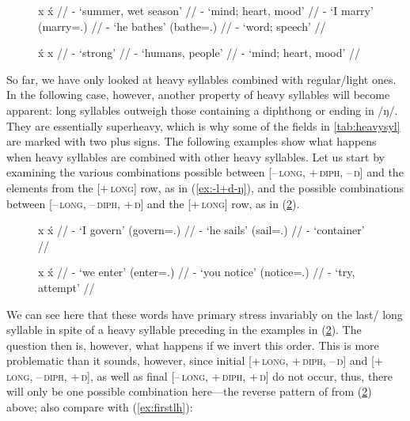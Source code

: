 \begin{figure}[h]
\pex[everygla=\upshape]\label{ex:firstlh}
\a\label{ex:firstlight}\begingl
	\gla x		{}	x́	{} //
	\glb {}	-	
		{`summer, wet season'} //
	\glb {}	-		{`mind; heart, mood'} //
	\glb {}	-	
		{`I marry' (marry=\Fsg{}.\Top{})} //
	\glb {}	-	
		{`he bathes' (bathe=\TsgM{}.\Aarg{})} //
	\glb {}	-		{`word; speech'} //
\endgl

\a\label{ex:firstheavy}\begingl
	\gla x́		{}	x		{} //
	\glb {}	-			{`strong'} //
	\glb {}	-		{`humans, people'} //
	\glb {}	-			{`mind; heart, mood'} //
\endgl
\xe
\end{figure}

So far, we have only looked at heavy syllables combined with regular/light
ones. In the following case, however, another property of heavy syllables will
become apparent: long syllables outweigh those containing a diphthong or ending
in /ŋ/. They are essentially superheavy, which is
why some of the fields in \autoref{tab:heavysyl} are marked with two plus
signs. The following examples show what happens when heavy syllables are
combined with other heavy syllables. Let us start by examining the various
combinations possible between \textsc{[–\,long, +\,diph, –\,ŋ]} and the
elements from the \textsc{[+\,long]} row, as in (\ref{ex:-l+d-ŋ}), and the
possible combinations between \textsc{[\mbox{–\,long,} \mbox{–\,diph,} +\,ŋ]}
and the \textsc{[+\,long]} row, as in (\ref{ex:-l-d+ŋ}).

\begin{figure}[h]
\pex[everygla=\upshape]\label{ex:lastheavy}
\a\label{ex:-l+d-ŋ}\begingl
	\gla x		{}	x́		{} //
	\glb {}	-		{`I govern' 
		(govern=\Fsg{}.\Top{})} //
	\glb {}	-		{`he sails' 
		(sail=\TsgM{}.\Aarg{})} //
	\glb {}	-		{`container'} //
\endgl

\a\label{ex:-l-d+ŋ}\begingl
	\gla x		{}	x́		{} //
	\glb {}	-		{`we enter' 
		(enter=\Fpl{}.\Top{})} //
	\glb {}	-		{`you notice' 
		(notice=\Ssg{}.\Aarg{})} //
	\glb {}	-		{`try, attempt'} //
\endgl
\xe
\end{figure}

We can see here that these words have primary stress invariably on the last/%
long syllable in spite of a heavy syllable preceding in the examples in
(\ref{ex:-l-d+ŋ}). The question then is, however, what happens if we invert
this order. This is more problematic than it sounds, however, since initial
\textsc{[+\,long, +\,diph, –\,ŋ]} and \textsc{[+\,long, –\,diph, +\,ŋ]}, as
well as final \textsc{[–\,long, +\,diph, +\,ŋ]} do not occur, thus, there will
only be one possible combination here---the reverse pattern of
 from (\ref{ex:-l-d+ŋ}) above; also
compare with (\ref{ex:firstlh}):


